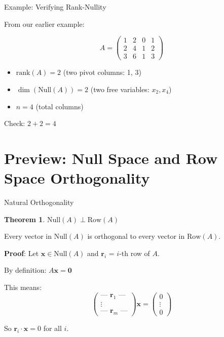 \documentclass[10pt]{beamer}
\theoremstyle{definition}
\newtheorem{thm}{Theorem}[section]
\newcommand{\x}[1]{\alert{\textbf{#1}}}
\begin{document}
\begin{frame}{Example: Verifying Rank-Nullity}

From our earlier example:

$$A = \begin{pmatrix}
1 & 2 & 0 & 1 \\
2 & 4 & 1 & 2 \\
3 & 6 & 1 & 3
\end{pmatrix}$$

\begin{itemize}
\item $\text{rank}(A) = 2$ (two pivot columns: 1, 3)
\item $\dim(\text{Null}(A)) = 2$ (two free variables: $x_2, x_4$)
\item $n = 4$ (total columns)
\end{itemize}

Check: $2 + 2 = 4$ \checkmark

\end{frame}

\section{Preview: Null Space and Row Space Orthogonality}

\begin{frame}{Natural Orthogonality}

\begin{thm}
$\text{Null}(A) \perp \text{Row}(A)$

Every vector in $\text{Null}(A)$ is orthogonal to every vector in $\text{Row}(A)$.
\end{thm}

\vspace{1em}

\x{Proof}: Let $\mathbf{x} \in \text{Null}(A)$ and $\mathbf{r}_i$ = $i$-th row of $A$.

By definition: $A\mathbf{x} = \mathbf{0}$

This means:
$$\begin{pmatrix} \text{— } \mathbf{r}_1 \text{ —} \\ \vdots \\ \text{— } \mathbf{r}_m \text{ —} \end{pmatrix} \mathbf{x} = \begin{pmatrix} 0 \\ \vdots \\ 0 \end{pmatrix}$$

So $\mathbf{r}_i \cdot \mathbf{x} = 0$ for all $i$.

\end{frame}
\end{document}
